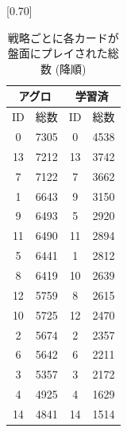 \documentclass[12pt]{jarticle}
\begin{document}
    \begin{table}[t]
      \centering
      \caption{戦略ごとに各カードが盤面にプレイされた総数 (降順)}
      \vspace{-0.3cm}
      \label{table:jikken2cardrecord}
      \scalebox{0.80}[0.70]{
        \begin{tabular}{|cc|cc|}
          \hline
          \multicolumn{2}{|c|}{アグロ}       & \multicolumn{2}{c|}{学習済}       \\ \hline
          \multicolumn{1}{|c|}{ID} & 総数    & \multicolumn{1}{c|}{ID} & 総数   \\ \hline \hline
          \multicolumn{1}{|c|}{0}  & 7305 & \multicolumn{1}{c|}{0}  & 4538 \\ \hline
          \multicolumn{1}{|c|}{13}  & 7212 & \multicolumn{1}{c|}{13} & 3742 \\ \hline
          \multicolumn{1}{|c|}{7}  & 7122 & \multicolumn{1}{c|}{7}  & 3662 \\ \hline
          \multicolumn{1}{|c|}{1} & 6643 & \multicolumn{1}{c|}{9}  & 3150 \\ \hline
          \multicolumn{1}{|c|}{9} & 6493 & \multicolumn{1}{c|}{5} & 2920 \\ \hline
          \multicolumn{1}{|c|}{11}  & 6490 & \multicolumn{1}{c|}{11}  & 2894 \\ \hline
          \multicolumn{1}{|c|}{5}  & 6441 & \multicolumn{1}{c|}{1}  & 2812 \\ \hline
          \multicolumn{1}{|c|}{8}  & 6419 & \multicolumn{1}{c|}{10}  & 2639 \\ \hline
          \multicolumn{1}{|c|}{12} & 5759 & \multicolumn{1}{c|}{8}  & 2615 \\ \hline
          \multicolumn{1}{|c|}{10} & 5725 & \multicolumn{1}{c|}{12}  & 2470 \\ \hline
          \multicolumn{1}{|c|}{2}  & 5674 & \multicolumn{1}{c|}{2} & 2357 \\ \hline
          \multicolumn{1}{|c|}{6}  & 5642 & \multicolumn{1}{c|}{6}  & 2211 \\ \hline
          \multicolumn{1}{|c|}{3} & 5357 & \multicolumn{1}{c|}{3}  & 2172 \\ \hline
          \multicolumn{1}{|c|}{4}  & 4925 & \multicolumn{1}{c|}{4} & 1629 \\ \hline
          \multicolumn{1}{|c|}{14}  & 4841 & \multicolumn{1}{c|}{14} & 1514 \\ \hline
          \end{tabular}
      }
      \end{table}
  
\end{document}
